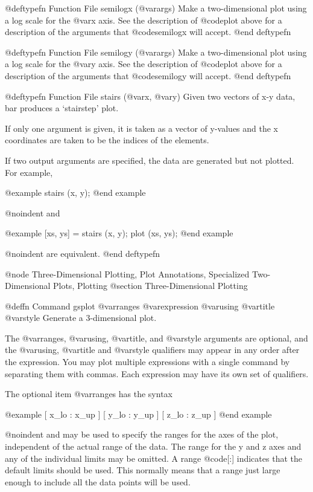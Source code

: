 @deftypefn {Function File} {} semilogx (@var{args})
Make a two-dimensional plot using a log scale for the @var{x} axis.  See
the description of @code{plot} above for a description of the arguments
that @code{semilogx} will accept.
@end deftypefn

@deftypefn {Function File} {} semilogy (@var{args})
Make a two-dimensional plot using a log scale for the @var{y} axis.  See
the description of @code{plot} above for a description of the arguments
that @code{semilogy} will accept.
@end deftypefn

@deftypefn {Function File} {} stairs (@var{x}, @var{y})
Given two vectors of x-y data, bar produces a `stairstep' plot.

If only one argument is given, it is taken as a vector of y-values
and the x coordinates are taken to be the indices of the elements.

If two output arguments are specified, the data are generated but
not plotted.  For example,

@example
stairs (x, y);
@end example

@noindent
and

@example
[xs, ys] = stairs (x, y);
plot (xs, ys);
@end example

@noindent
are equivalent.
@end deftypefn

@node Three-Dimensional Plotting, Plot Annotations, Specialized Two-Dimensional Plots, Plotting
@section Three-Dimensional Plotting

@deffn {Command} gsplot @var{ranges} @var{expression} @var{using} @var{title} @var{style}
Generate a 3-dimensional plot.

The @var{ranges}, @var{using}, @var{title}, and @var{style} arguments
are optional, and the @var{using}, @var{title} and @var{style}
qualifiers may appear in any order after the expression.  You may plot
multiple expressions with a single command by separating them with
commas.  Each expression may have its own set of qualifiers.

The optional item @var{ranges} has the syntax

@example
[ x_lo : x_up ] [ y_lo : y_up ] [ z_lo : z_up ]
@end example

@noindent
and may be used to specify the ranges for the axes of the plot,
independent of the actual range of the data.  The range for the y and z
axes and any of the individual limits may be omitted.  A range
@code{[:]} indicates that the default limits should be used.  This
normally means that a range just large enough to include all the data
points will be used.

